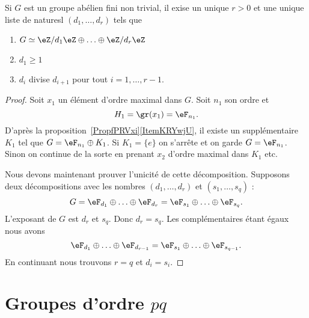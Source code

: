 \begin{theorem} \label{ThoRJWVJd}
	Si \( G\) est un groupe abélien fini non trivial, il exise un unique \( r>0\) et une unique liste de naturesl \( (d_1,\ldots, d_r)\) tels que
	\begin{enumerate}
		\item
		      $G\simeq \eZ/d_1\eZ\oplus\ldots\oplus \eZ/d_r\eZ$
		\item
		      \( d_1\geq 1\)
		\item
		      \( d_i\) divise \( d_{i+1}\) pour tout \( i=1,\ldots, r-1\).
	\end{enumerate}
\end{theorem}

\begin{proof}
	Soit \( x_1\) un élément d'ordre maximal dans \( G\). Soit \( n_1\) son ordre et
	\begin{equation}
		H_1=\gr(x_1)=\eF_{n_1}.
	\end{equation}
	D'après la proposition~\ref{PropfPRVxi}\ref{ItemKRYwjU}, il existe un supplémentaire \( K_1\) tel que \( G=\eF_{n_1}\oplus K_1\). Si \( K_1=\{ e \}\) on s'arrête et on garde \( G=\eF_{n_1}\). Sinon on continue de la sorte en prenant \( x_2\) d'ordre maximal dans \( K_1\) etc.

	Nous devons maintenant prouver l'unicité de cette décomposition. Supposons deux décompositions avec les nombres \( (d_1,\ldots, d_r)\) et \( (s_1,\ldots, s_q)\) :
	\begin{equation}
		G=\eF_{d_1}\oplus\ldots\oplus \eF_{d_r}=\eF_{s_1}\oplus\ldots\oplus \eF_{s_q}.
	\end{equation}
	L'exposant de \( G\) est \( d_r\) et \( s_q\). Donc \( d_r=s_q\). Les complémentaires étant égaux nous avons
	\begin{equation}
		\eF_{d_1}\oplus\ldots\oplus \eF_{d_{r-1}}=\eF_{s_1}\oplus\ldots\oplus \eF_{s_{q-1}}.
	\end{equation}
	En continuant nous trouvons \( r=q\) et \( d_i=s_i\).
\end{proof}

\section{Groupes d'ordre \texorpdfstring{\(  pq\)}{pq}}

